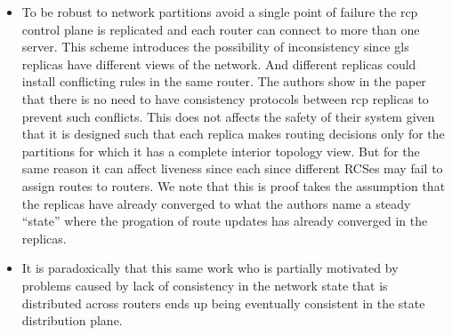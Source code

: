\begin{itemize}
\item To be robust to network partitions avoid a single point of failure the \gls{rcp} control plane is replicated and each router can connect to more than one server. 
This scheme introduces the possibility of inconsistency since  \gls{gls} replicas have different views of the network. 
And different replicas could install conflicting rules in the same router. 
The authors show in the paper that there is no need to have consistency protocols between \gls{rcp} replicas to prevent such conflicts. 
This does not affects the safety of their system given that it is designed such that each replica makes routing decisions only for the partitions for which it has a complete interior topology view. But for the same reason it can affect liveness since each since different RCSes may fail to assign routes to routers. 
We note that this is proof takes the assumption that the replicas have already converged to what the authors name a steady ``state''  where the progation of route updates has already converged in the \gls{replicas}. 


\item It is paradoxically that this same work who is partially motivated by problems caused by lack of consistency in the network state that is distributed across routers ends up being eventually consistent in the state distribution plane. 
\end{itemize}


